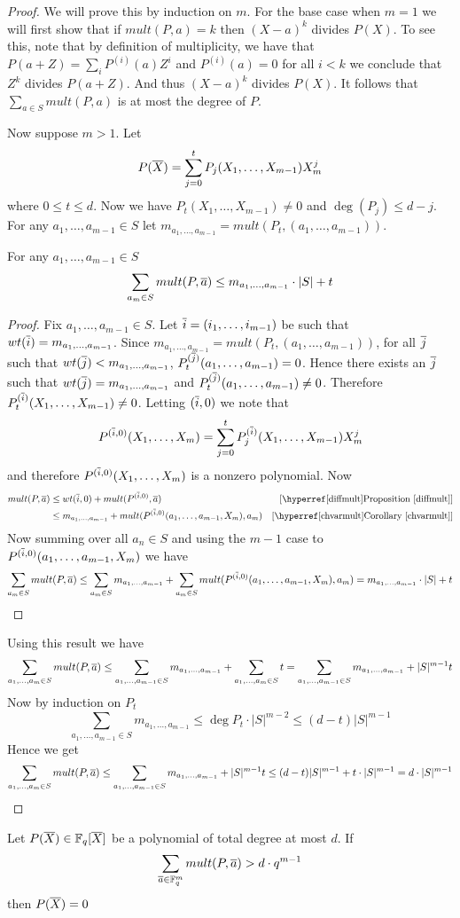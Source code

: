\begin{proof}
	We will prove this by induction on $m$. For the base case when $m=1$ we will first show that if $mult(P,a)=k$ then $(X-a)^k$ divides $P(X)$. To see this, note that by definition of multiplicity, we have that $P(a+Z)=\sum\limits_{i}P^{(i)}(a)Z^{i}$ and $P^{(i)}(a)=0$ for all $i<k$ we conclude that $Z^k$ divides $P(a+Z)$. And thus $(X-a)^k$ divides $P(X)$. It follows that $\sum\limits_{a\in S} mult(P,a)$ is at most the degree of $P$. 
	
	Now suppose $m>1$. Let $$P(\overline{X})=\sum_{j=0}^t P_j(X_1,\dots, X_{m-1})X^j_m$$where $0\leq t\leq d$. Now we have $P_t(X_1,\dots, X_{m-1})\neq 0$ and $\deg(P_j)\leq d-j$. For any $a_1,\dots, a_{m-1}\in S$ let $m_{a_1,\dots, a_{m-1}}=mult(P_t,(a_1,\dots, a_{m-1}))$. 
	\begin{claim}
		For any $a_1,\dots, a_{m-1}\in S$ $$\sum_{a_m\in S}mult(P, \overline{a})\leq m_{a_1,\dots,a_{m-1}}\cdot |S|+t$$
	\end{claim}
	\begin{proof}
		Fix $a_1,\dots, a_{m-1}\in S$. Let $\overline{i}=(i_1,\dots, i_{m-1})$ be such that $wt(\overline{i})=m_{a_1,\dots,a_{m-1}}$. Since $m_{a_1,\dots, a_{m-1}}=mult(P_t,(a_1,\dots, a_{m-1}))$, for all $\overline{j}$ such that $wt(\overline{j})<m_{a_1,\dots, a_{m-1}}$, $P_t^{(\overline{j})}(a_1,\dots, a_{m-1})=0$. Hence there exists an $\overline{j}$ such that $wt(\overline{j})=m_{a_1,\dots, a_{m-1}}$ and $P_t^{(\overline{j})}(a_1,\dots, a_{m-1})\neq 0$. Therefore  $P_t^{(\overline{i})}(X_1,\dots, X_{m-1})\neq 0$. Letting $(\overline{i},0)$ we note that $$P^{(\overline{i},0)}(X_1,\dots, X_m)=\sum_{j=0}^tP_j^{(\overline{i})}(X_1,\dots, X_{m-1})X_m^j$$and therefore $P^{(\overline{i},0)}(X_1,\dots, X_m)$ is a nonzero polynomial. Now
		\begin{align*}
			mult(P,\ova) & \leq wt(\ovi,0)+mult(P^{(\ovi,0)}, \ova) & [\text{\propref{diffmult}}]\\
			& \leq m_{a_1,\dots, a_{m-1}}+mult(P^{(\ovi,0)}(a_1,\dots, a_{m-1},X_m),a_m) & [\text{\cormref{chvarmult}}]
		\end{align*}
		Now summing over all $a_n\in S$ and using the $m-1$ case to $P^{(\overline{i},0)}(a_1,\dots, a_{m-1},X_m)$ we have $$\sum_{a_m\in S}mult(P, \overline{a})\leq \sum_{a_m\in S}m_{a_1,\dots, a_{m-1}}+\sum_{a_m\in S}mult(P^{(\overline{i},0)}(a_1,\dots, a_{m-1},X_m),a_m)= m_{a_1,\dots,a_{m-1}}\cdot |S|+t$$
	\end{proof}
	Using this result we have $$\sum_{a_1,\dots, a_{m}\in S}mult(P,\overline{a})\leq \sum_{a_1,\dots, a_{m-1}\in S}m_{a_1,\dots, a_{m-1}}+\sum_{a_1,\dots, a_{m}\in S} t=\sum_{a_1,\dots, a_{m-1}\in S}m_{a_1,\dots, a_{m-1}}+|S|^{m-1}t$$Now by induction on $P_t$ $$\sum_{a_1,\dots, a_{m-1}\in S}m_{a_1,\dots, a_{m-1}} \leq \deg P_t \cdot |S|^{m-2}\leq (d-t)|S|^{m-1}$$ Hence we get $$\sum_{a_1,\dots, a_{m}\in  S}mult(P,\overline{a})\leq \sum_{a_1,\dots, a_{m-1}\in S}m_{a_1,\dots, a_{m-1}}+|S|^{m-1}t\leq (d-t)|S|^{m-1}+t\cdot |S|^{m-1}=d\cdot |S|^{m-1}$$
\end{proof}
\begin{corollary}
	Let $P(\overline{X})\in \mathbb{F}_q[\overline{X}]$ be a polynomial of total degree at most $d$. If $$\sum_{\overline{a}\in \mathbb{F}_q^m}mult(P,\overline{a})>d\cdot q^{m-1}$$then $P(\overline{X})=0$
\end{corollary}
